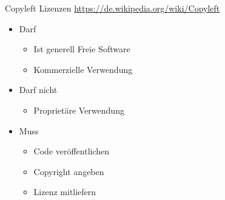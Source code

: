 \note
{
	Copyleft Lizenzen \url{https://de.wikipedia.org/wiki/Copyleft}
	\begin{itemize}
		\item Darf
		\begin{itemize}
			\item Ist generell Freie Software
			\item Kommerzielle Verwendung
		\end{itemize}
		\item Darf nicht
		\begin{itemize}
			\item Proprietäre Verwendung
		\end{itemize}
		\item Muss
		\begin{itemize}
			\item Code veröffentlichen
			\item Copyright angeben
			\item Lizenz mitliefern
		\end{itemize}
	\end{itemize}
}

